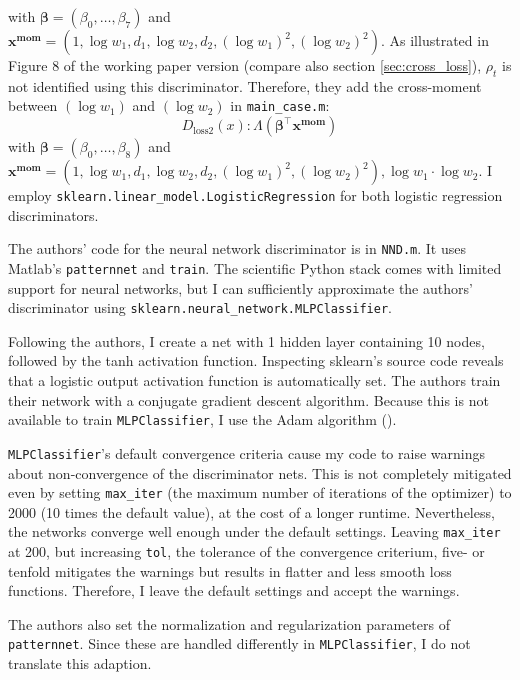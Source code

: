 with $\mathbf{\beta} = (\beta_0, \dots, \beta_7)$ and $\mathbf{x^{mom}} = (1, \log w_1, d_1, \log w_2, d_2, (\log w_1)^2, (\log w_2)^2)$.
As illustrated in Figure 8 of the working paper version (compare also section \ref{sec:cross_loss}), $\rho_t$ is not identified using this discriminator.
Therefore, they add the cross-moment between $(\log w_1)$ and $(\log w_2)$ in \texttt{main\_case.m}:
\begin{equation}
    D_{\text{loss2}}(x) : \Lambda(\mathbf{\beta}^{\intercal} \mathbf{x^{mom}})
\end{equation}
with $\mathbf{\beta} = (\beta_0, \dots, \beta_8)$ and $\mathbf{x^{mom}} = (1, \log w_1, d_1, \log w_2, d_2, (\log w_1)^2, (\log w_2)^2), \log w_1 \cdot \log w_2$.
I employ \texttt{sklearn.linear\_model.LogisticRegression} for both logistic regression discriminators.

The authors' code for the neural network discriminator is in \texttt{NND.m}.
It uses Matlab's \texttt{patternnet} and \texttt{train}.
The scientific Python stack comes with limited support for neural networks, but I can sufficiently approximate the authors' discriminator using \texttt{sklearn.neural\_network.MLPClassifier}.

Following the authors, I create a net with 1 hidden layer containing 10 nodes, followed by the tanh activation function.
Inspecting sklearn's source code reveals that a logistic output activation function is automatically set. %
The authors train their network with a conjugate gradient descent algorithm.
Because this is not available to train \texttt{MLPClassifier}, I use the Adam algorithm (\textcite{diederik2014adam}).

\texttt{MLPClassifier}'s default convergence criteria cause my code to raise warnings about non-convergence of the discriminator nets.
This is not completely mitigated even by setting \texttt{max\_iter} (the maximum number of iterations of the optimizer) to 2000 (10 times the default value), at the cost of a longer runtime. %
Nevertheless, the networks converge well enough under the default settings. %
Leaving \texttt{max\_iter} at 200, but increasing \texttt{tol}, the tolerance of the convergence criterium, five- or tenfold mitigates the warnings but results in flatter and less smooth loss functions. %
Therefore, I leave the default settings and accept the warnings.

The authors also set the normalization and regularization parameters of \texttt{patternnet}.
Since these are handled differently in \texttt{MLPClassifier}, I do not translate this adaption.

